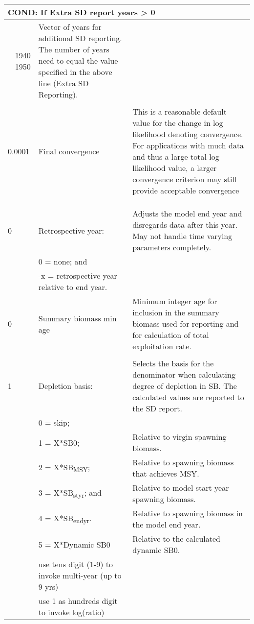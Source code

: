{\begin{landscape}
\begin{longtable}{p{1.5cm} p{7.2cm} p{12.3cm}}
 \hline  
 \multicolumn{3}{l}{COND: If Extra SD report years > 0} \Tstrut\\

 \hline
 \multicolumn{1}{r}{1940 1950} & \multirow{1}{1cm}[-0.25cm]{\parbox{19.5cm}{Vector of years for additional SD reporting. The number of years need to equal the value specified in the above line (Extra SD Reporting). }} \Tstrut\\
 & & \\

 
 \hline
 0.0001 & Final convergence & \multirow{1}{1cm}[-0.25cm]{\parbox{12.5cm}{This is a reasonable default value for the change in log likelihood denoting convergence.  For applications with much data and thus a large total log likelihood value, a larger convergence criterion may still provide acceptable convergence}}\Tstrut\\
        & & \\
        & & \\
		& & \\ 
 
 \hline
 0 & Retrospective year: & \multirow{1}{1cm}[-0.25cm]{\parbox{12.5cm}{Adjusts the model end year and disregards data after this year.  May not handle time varying parameters completely.}} \Tstrut\\
   & 0 = none; and & \\
   & -x = retrospective year relative to end year. & \\
  
 \hline
 0 & Summary biomass min age & \multirow{1}{1cm}[-0.25cm]{\parbox{12.5cm}{Minimum integer age for inclusion in the summary biomass used for reporting and for calculation of total exploitation rate.}}\Tstrut\\
   & & \\ 

 \hline
 1 & Depletion basis: & \multirow{1}{1cm}[-0.25cm]{\parbox{12.5cm}{Selects the basis for the denominator when calculating degree of depletion in SB.  The calculated values are reported to the SD report.}}\Tstrut\\
   & 0 = skip; & \\
   & 1 = X*SB0; & Relative to virgin spawning biomass.\\
   & 2 = X*SB\textsubscript{MSY}; & Relative to spawning biomass that achieves MSY.\\
   & 3 = X*SB\textsubscript{styr}; and & Relative to model start year spawning biomass.\\
   & 4 = X*SB\textsubscript{endyr}. & Relative to spawning biomass in the model end year.\\
   & 5 = X*Dynamic SB0 & Relative to the calculated dynamic SB0. \\
   & use tens digit (1-9) to invoke multi-year (up to 9 yrs) & \\
   & use 1 as hundreds digit to invoke log(ratio) & \\
  

\end{longtable}
\end{landscape}}

